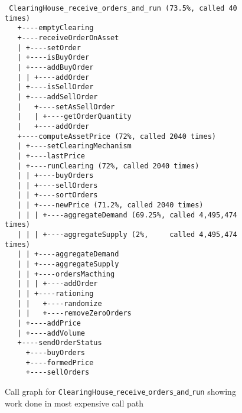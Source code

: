 \begin{figure}
\begin{verbatim}
 ClearingHouse_receive_orders_and_run (73.5%, called 40 times)
   +----emptyClearing
   +----receiveOrderOnAsset
   | +----setOrder
   | +----isBuyOrder
   | +----addBuyOrder
   | | +----addOrder
   | +----isSellOrder
   | +----addSellOrder
   |   +----setAsSellOrder
   |   | +----getOrderQuantity
   |   +----addOrder
   +----computeAssetPrice (72%, called 2040 times)
   | +----setClearingMechanism
   | +----lastPrice
   | +----runClearing (72%, called 2040 times)
   | | +----buyOrders
   | | +----sellOrders
   | | +----sortOrders
   | | +----newPrice (71.2%, called 2040 times)
   | | | +----aggregateDemand (69.25%, called 4,495,474 times)
   | | | +----aggregateSupply (2%,     called 4,495,474 times)
   | | +----aggregateDemand
   | | +----aggregateSupply
   | | +----ordersMacthing
   | | | +----addOrder
   | | +----rationing
   | |   +----randomize
   | |   +----removeZeroOrders
   | +----addPrice
   | +----addVolume
   +----sendOrderStatus
     +----buyOrders
     +----formedPrice
     +----sellOrders\end{verbatim}
\caption{Call graph for \texttt{ClearingHouse$\_$receive$\_$orders$\_$and$\_$run} showing work done in most expensive call path\label{fig:CH_call_graph}}
\end{figure}

